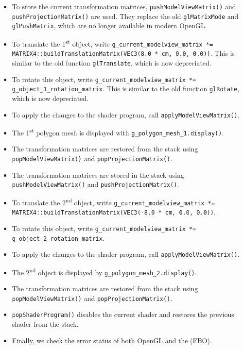 \documentclass[11pt,oneside,a4paper,final]{article}
\begin{document}
\begin{itemize}
 \item To store the current transformation matrices, 
    \verb+pushModelViewMatrix()+ and \verb+pushProjectionMatrix()+ are used. 
    They replace the old \verb+glMatrixMode+ and \verb+glPushMatrix+, which are 
    no longer available in modern OpenGL.

  \item To translate the 1\textsuperscript{st} object, write
    \verb+g_current_modelview_matrix *=+\\
    \verb+MATRIX4::buildTranslationMatrix(VEC3(8.0 * cm, 0.0, 0.0))+. This is 
    similar to the old function \verb+glTranslate+, which is now depreciated. 

   \item To rotate this object, write 
     \verb+g_current_modelview_matrix *= g_object_1_rotation_matrix+. This is 
    similar to the old function \verb+glRotate+, which is now depreciated. 

  \item To apply the changes to the shader program, call 
    \verb+applyModelViewMatrix()+.
    
  \item The 1\textsuperscript{st} polygon mesh is displayed with 
    \verb+g_polygon_mesh_1.display()+.

  \item The transformation matrices are restored from the stack using 
    \verb+popModelViewMatrix()+ and \verb+popProjectionMatrix()+.

  \item The transformation matrices are stored in the stack using 
    \verb+pushModelViewMatrix()+ and \verb+pushProjectionMatrix()+.

  \item To translate the 2\textsuperscript{nd} object, write
    \verb+g_current_modelview_matrix *=+\\
    \verb+MATRIX4::buildTranslationMatrix(VEC3(-8.0 * cm, 0.0, 0.0))+.

   \item To rotate this object, write 
     \verb+g_current_modelview_matrix *= g_object_2_rotation_matrix+.

  \item To apply the changes to the shader program, call 
    \verb+applyModelViewMatrix()+.

  \item The 2\textsuperscript{nd} object is displayed by 
    \verb+g_polygon_mesh_2.display()+.

  \item The transformation matrices are restored from the stack using 
    \verb+popModelViewMatrix()+ and \verb+popProjectionMatrix()+.

  \item \verb+popShaderProgram()+ disables the current shader and restores the 
    previous shader from the stack.

  \item Finally, we check the error status of both OpenGL and the (FBO).

\end{itemize}
\end{document}
